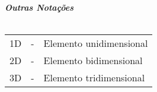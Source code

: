 \newline \newline
\textbf{\emph{Outras Notações}}\\\\
\noindent
\begin{tabular}{l c p{.8\linewidth} }

	1D & - & Elemento unidimensional\\
	2D & - & Elemento bidimensional\\
	3D & - & Elemento tridimensional\\
	
\end{tabular}
